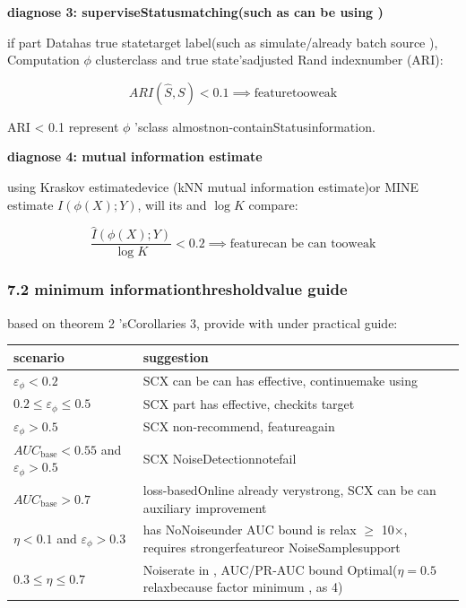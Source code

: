 \documentclass[
  12pt,
]{article}
\begin{document}
\textbf{diagnose 3: superviseStatusmatching(such as can be using )}

if part Datahas true statetarget label(such as simulate/already  batch source ), Computation \(\phi\)
clusterclass and true state'sadjusted Rand indexnumber (ARI):

\[ARI(\hat{S}, S) < 0.1 \implies \text{featuretooweak}\]

ARI \textless{} 0.1 represent \(\phi\) 'sclass almostnon-containStatusinformation. 

\textbf{diagnose 4: mutual information estimate}

using  Kraskov estimatedevice (kNN mutual information estimate)or  MINE estimate
\(I(\phi(X); Y)\), will its and  \(\log K\) compare: 

\[\frac{\hat{I}(\phi(X); Y)}{\log K} < 0.2 \implies \text{featurecan be can tooweak}\]

\subsubsection{7.2
minimum informationthresholdvalue guide}\label{ux6700ux5c0fux4fe1ux606fux9608ux503cux6307ux5357}

based on theorem  2 'sCorollaries 3, provide with under practical guide: 

\begin{longtable}[]{@{}
  >{\raggedright\arraybackslash}p{}
  >{\raggedright\arraybackslash}p{}@{}}
\toprule\noalign{}
\begin{minipage}[b]{\linewidth}\raggedright
scenario 
\end{minipage} & \begin{minipage}[b]{\linewidth}\raggedright
suggestion
\end{minipage} \\
\midrule\noalign{}
\endhead
\bottomrule\noalign{}
\endlastfoot
\(\varepsilon_\phi < 0.2\) & SCX can be can has effective, continuemake using  \\
\(0.2 \leq \varepsilon_\phi \leq 0.5\) & SCX part has effective, checkits target  \\
\(\varepsilon_\phi > 0.5\) & SCX non-recommend, featureagain  \\
\(AUC_{\text{base}} < 0.55\) and  \(\varepsilon_\phi > 0.5\) & SCX
NoiseDetectionnotefail \\
\(AUC_{\text{base}} > 0.7\) & loss-basedOnline already verystrong, SCX can be can auxiliary improvement \\
\(\eta < 0.1\) and  \(\varepsilon_\phi > 0.3\) & has NoNoiseunder  AUC bound is relax
\(\geq\) 10\(\times\), requires strongerfeatureor NoiseSamplesupport \\
\(0.3 \leq \eta \leq 0.7\) & Noiserate in , AUC/PR-AUC bound Optimal(\(\eta=0.5\)
relaxbecause factor minimum , as  4) \\
\end{longtable}
\end{document}
